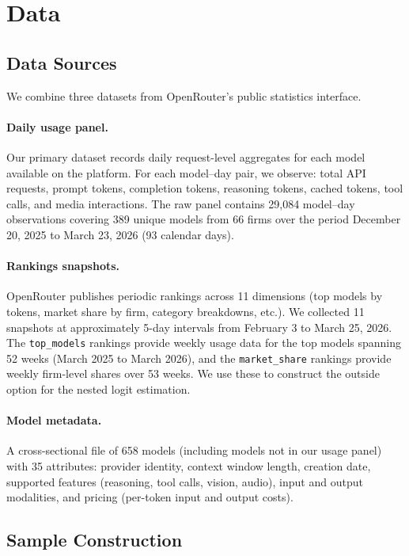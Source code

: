 \documentclass[11pt, a4paper]{article}
\begin{document}
\section{Data}
\label{sec:data}

\subsection{Data Sources}

We combine three datasets from OpenRouter's public statistics interface.

\paragraph{Daily usage panel.} Our primary dataset records daily request-level aggregates for each model available on the platform. For each model--day pair, we observe: total API requests, prompt tokens, completion tokens, reasoning tokens, cached tokens, tool calls, and media interactions. The raw panel contains 29,084 model--day observations covering 389 unique models from 66 firms over the period December 20, 2025 to March 23, 2026 (93 calendar days).

\paragraph{Rankings snapshots.} OpenRouter publishes periodic rankings across 11 dimensions (top models by tokens, market share by firm, category breakdowns, etc.). We collected 11 snapshots at approximately 5-day intervals from February 3 to March 25, 2026. The \texttt{top\_models} rankings provide weekly usage data for the top models spanning 52 weeks (March 2025 to March 2026), and the \texttt{market\_share} rankings provide weekly firm-level shares over 53 weeks. We use these to construct the outside option for the nested logit estimation.

\paragraph{Model metadata.} A cross-sectional file of 658 models (including models not in our usage panel) with 35 attributes: provider identity, context window length, creation date, supported features (reasoning, tool calls, vision, audio), input and output modalities, and pricing (per-token input and output costs).

\subsection{Sample Construction}
\end{document}
